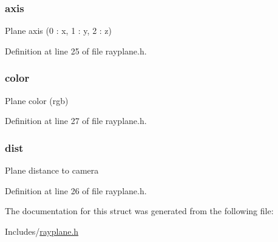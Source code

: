 \subsubsection[{\texorpdfstring{axis}{axis}}]{ axis}\hypertarget{structplane_a0fef057ff8b9f6d358fcb427b1166edc}{}\label{structplane_a0fef057ff8b9f6d358fcb427b1166edc}
Plane axis (0 \+: x, 1 \+: y, 2 \+: z) 

Definition at line 25 of file rayplane.\+h.

\subsubsection[{\texorpdfstring{color}{color}}]{ color}\hypertarget{structplane_af1ec6dab64553dc67dc77bdc13deecb8}{}\label{structplane_af1ec6dab64553dc67dc77bdc13deecb8}
Plane color (rgb) 

Definition at line 27 of file rayplane.\+h.

\subsubsection[{\texorpdfstring{dist}{dist}}]{ dist}\hypertarget{structplane_a07e9dd77b166f64838cd72a6213894ef}{}\label{structplane_a07e9dd77b166f64838cd72a6213894ef}
Plane distance to camera 

Definition at line 26 of file rayplane.\+h.



The documentation for this struct was generated from the following file\+:\begin{DoxyCompactItemize}
\item 
Includes/\hyperlink{rayplane_8h}{rayplane.\+h}\end{DoxyCompactItemize}

